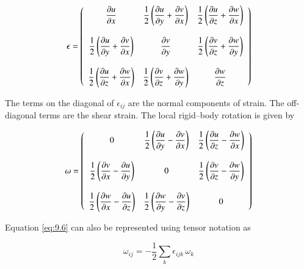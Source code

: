 \begin{equation}\label{eq:9.5}
\mathbf{\epsilon} = \left(
\begin{array}{c c c}
  \dfrac{\partial u}{\partial x} &
  \dfrac{1}{2}\left(\dfrac{\partial u}{\partial y} + \dfrac{\partial v}{\partial x}\right) &
  \dfrac{1}{2}\left(\dfrac{\partial u}{\partial z} + \dfrac{\partial w}{\partial x}\right) \\ \\
  \dfrac{1}{2}\left(\dfrac{\partial u}{\partial y} + \dfrac{\partial v}{\partial x}\right) &
  \dfrac{\partial v}{\partial y} &
  \dfrac{1}{2}\left(\dfrac{\partial v}{\partial z} + \dfrac{\partial w}{\partial y}\right) \\ \\
  \dfrac{1}{2}\left(\dfrac{\partial u}{\partial z} + \dfrac{\partial w}{\partial x}\right) &
  \dfrac{1}{2}\left(\dfrac{\partial v}{\partial z} + \dfrac{\partial w}{\partial y}\right) &
  \dfrac{\partial w}{\partial z}
\end{array}\right)
\end{equation}

The terms on the diagonal of $\epsilon_{ij}$ are the normal components of strain. The off-diagonal terms are the shear strain. The local rigid--body rotation is given by

\begin{equation}\label{eq:9.6}
\mathbf{\omega} = \left(
\begin{array}{c c c}
  0 &
  \dfrac{1}{2}\left(\dfrac{\partial u}{\partial y} - \dfrac{\partial v}{\partial x}\right) &
  \dfrac{1}{2}\left(\dfrac{\partial u}{\partial z} - \dfrac{\partial w}{\partial x}\right) \\ \\
  \dfrac{1}{2}\left(\dfrac{\partial v}{\partial x} - \dfrac{\partial u}{\partial y}\right) &
  0 &
  \dfrac{1}{2}\left(\dfrac{\partial v}{\partial z} - \dfrac{\partial w}{\partial y}\right) \\ \\
  \dfrac{1}{2}\left(\dfrac{\partial w}{\partial x} - \dfrac{\partial u}{\partial z}\right) &
  \dfrac{1}{2}\left(\dfrac{\partial w}{\partial y} - \dfrac{\partial v}{\partial z}\right) &
  0
\end{array}\right)
\end{equation}

Equation \ref{eq:9.6} can also be represented using tensor notation as

\begin{equation}\label{eq:9.7}
\omega_{ij} = -\dfrac{1}{2}\sum_{k} \epsilon_{ijk}\, \omega_{k}
\end{equation}

